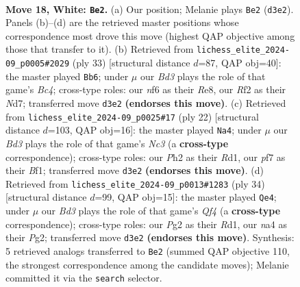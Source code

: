 \documentclass[11pt]{article}
\begin{document}
\clearpage

\begin{figure}[p]\centering
\begin{subfigure}{0.46\textwidth}\centering
\resizebox{\linewidth}{!}{%
\newchessgame
\chessboard[
  setfen={r5k1/3brppp/4pn2/p1pq4/n7/3BP1P1/PP3RPP/RNQ1N1K1 w - - 0 18},
  showmover=false,
  pgfstyle=straightmove, color=movearrow, markmove={d3-e2}
]}
\caption{}
\end{subfigure}\hfill
\begin{subfigure}{0.46\textwidth}\centering
\resizebox{\linewidth}{!}{%
\newchessgame
\chessboard[
  setfen={4r2k/1ppn2pp/2n1q3/p1b1pr2/4N3/2P2NPP/PP2QPK1/R1B1R3 b - - 1 17},
  showmover=false,
  pgfstyle=straightmove, color=movearrow, markmove={c5-b6}
]}
\caption{}
\end{subfigure}
\\[4pt]
\begin{subfigure}{0.46\textwidth}\centering
\resizebox{\linewidth}{!}{%
\newchessgame
\chessboard[
  setfen={r1b2rk1/pp3ppp/1qn1pn2/8/2Pb1B2/P1N2N2/1PQ2PPP/3RKB1R w K - 0 12},
  showmover=false,
  pgfstyle=straightmove, color=movearrow, markmove={c3-a4}
]}
\caption{}
\end{subfigure}\hfill
\begin{subfigure}{0.46\textwidth}\centering
\resizebox{\linewidth}{!}{%
\newchessgame
\chessboard[
  setfen={r1br2k1/ppp2ppp/2n2q2/8/3p1Q1P/3B1N2/PPP2PP1/1K1R3R w - - 7 18},
  showmover=false,
  pgfstyle=straightmove, color=movearrow, markmove={f4-e4}
]}
\caption{}
\end{subfigure}
\caption{\textbf{Move 18, White: \texttt{Be2}.} (a) Our position; Melanie plays \texttt{Be2} (\texttt{d3e2}). Panels (b)--(d) are the retrieved master positions whose correspondence most drove this move (highest QAP objective among those that transfer to it). (b) Retrieved from \texttt{lichess\_elite\_2024-09\_p0005\#2029} (ply 33) [structural distance $d$=87, QAP obj=40]: the master played \texttt{Bb6}; under $\mu$ our \emph{Bd3} plays the role of that game's \emph{Bc4}; cross-type roles: our \emph{n}f6 as their \emph{R}e8, our \emph{R}f2 as their \emph{N}d7; transferred move \texttt{d3e2} \textbf{(endorses this move)}. (c) Retrieved from \texttt{lichess\_elite\_2024-09\_p0025\#17} (ply 22) [structural distance $d$=103, QAP obj=16]: the master played \texttt{Na4}; under $\mu$ our \emph{Bd3} plays the role of that game's \emph{Nc3} (a \textbf{cross-type} correspondence); cross-type roles: our \emph{P}h2 as their \emph{R}d1, our \emph{p}f7 as their \emph{B}f1; transferred move \texttt{d3e2} \textbf{(endorses this move)}. (d) Retrieved from \texttt{lichess\_elite\_2024-09\_p0013\#1283} (ply 34) [structural distance $d$=99, QAP obj=15]: the master played \texttt{Qe4}; under $\mu$ our \emph{Bd3} plays the role of that game's \emph{Qf4} (a \textbf{cross-type} correspondence); cross-type roles: our \emph{P}g2 as their \emph{R}d1, our \emph{n}a4 as their \emph{P}g2; transferred move \texttt{d3e2} \textbf{(endorses this move)}. Synthesis: 5 retrieved analogs transferred to \texttt{Be2} (summed QAP objective 110, the strongest correspondence among the candidate moves); Melanie committed it via the \texttt{search} selector.}
\label{fig:thought-m34}
\end{figure}
\end{document}
